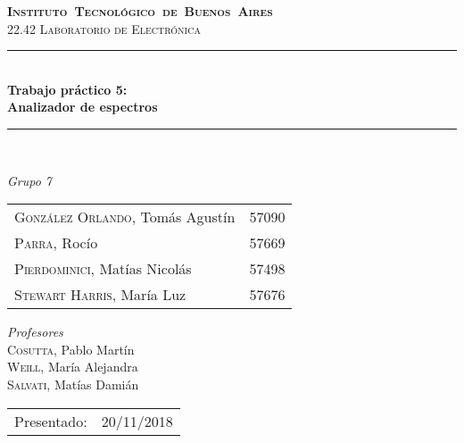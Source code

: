 \begin{titlepage}
\newcommand{\HRule}{\rule{\linewidth}{0.5mm}}
\center
\mbox{\textsc{\LARGE \bfseries {Instituto Tecnol\'ogico de Buenos Aires}}}\\[1.5cm]
\textsc{\Large 22.42 Laboratorio de Electr\'onica}\\[0.5cm]


\HRule \\[0.6cm]
{ \Huge \bfseries Trabajo pr\'actico 5: \\ Analizador de espectros}\\[0.4cm] %
\HRule \\[1.5cm]


{\large

\emph{Grupo 7}\\
\vspace{3px}

\begin{tabular}{lr} 	
\textsc{Gonz\'alez Orlando}, Tom\'as Agust\'in  & 57090 \\
\textsc{Parra}, Roc\'io  & 57669 \\ 	
\textsc{Pierdominici}, Mat\'ias Nicol\'as & 57498 \\
\textsc{Stewart Harris}, Mar\'ia Luz  & 57676 \\ 	     
\end{tabular}

\vspace{20px}

\emph{Profesores}\\
\vspace{3px}
\textsc{Cosutta,} Pablo Mart\'in\\ 	
\textsc{Weill,} Mar\'ia Alejandra\\
\textsc{Salvati,} Mat\'ias Dami\'an \\

\vspace{100px}

\begin{tabular}{ll}

Presentado: & 20/11/2018\\

\end{tabular}

}

\vfill

\end{titlepage}
